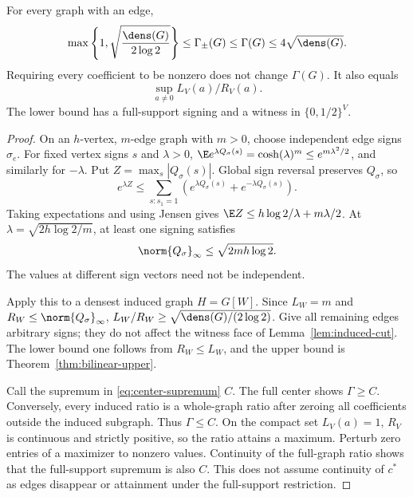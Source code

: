 \begin{theorem}\label{thm:graph-density}
For every graph with an edge,
\begin{equation}\label{eq:graph-density}
 \max\left\{1,\sqrt{\frac{\dens(G)}{2\log2}}\right\}
 \le\Gamma_\pm(G)\le\Gamma(G)\le4\sqrt{\dens(G)}.
\end{equation}
Requiring every coefficient to be nonzero does not change $\Gamma(G)$.
It also equals
\begin{equation}\label{eq:center-supremum}
 \sup_{a\ne0}L_V(a)/R_V(a).
\end{equation}
The lower bound has a full-support signing and a witness in $\{0,1/2\}^V$.
\end{theorem}
\begin{proof}
On an $h$-vertex, $m$-edge graph with $m>0$, choose independent edge signs
$\sigma_e$. For fixed vertex signs $s$ and $\lambda>0$,
$\E e^{\lambda Q_\sigma(s)}=\cosh(\lambda)^m\le e^{m\lambda^2/2}$,
and similarly for $-\lambda$. Put $Z=\max_s|Q_\sigma(s)|$. Global sign
reversal preserves $Q_\sigma$, so
\[
 e^{\lambda Z}\le\sum_{s:s_1=1}
       (e^{\lambda Q_\sigma(s)}+e^{-\lambda Q_\sigma(s)}).
\]
Taking expectations and using Jensen gives
$\E Z\le h\log2/\lambda+m\lambda/2$. At
$\lambda=\sqrt{2h\log2/m}$, at least one signing satisfies
\begin{equation}\label{eq:random-sign}
 \norm{Q_\sigma}_\infty\le\sqrt{2mh\log2}.
\end{equation}
The values at different sign vectors need not be independent.

Apply this to a densest induced graph $H=G[W]$. Since $L_W=m$ and
$R_W\le\norm{Q_\sigma}_\infty$,
$L_W/R_W\ge\sqrt{\dens(G)/(2\log2)}$. Give all remaining edges arbitrary
signs; they do not affect the witness face of Lemma~\ref{lem:induced-cut}.
The lower bound one follows from $R_W\le L_W$, and the upper bound is
Theorem~\ref{thm:bilinear-upper}.

Call the supremum in \eqref{eq:center-supremum} $C$. The full center shows
$\Gamma\ge C$. Conversely, every induced ratio is a whole-graph ratio
after zeroing all coefficients outside the induced subgraph. Thus
$\Gamma\le C$. On the compact set $L_V(a)=1$, $R_V$ is continuous and
strictly positive, so the ratio attains a maximum. Perturb zero entries
of a maximizer to nonzero values. Continuity of the full-graph ratio shows
that the full-support supremum is also $C$. This does not assume continuity
of $c^*$ as edges disappear or attainment under the full-support restriction.
\end{proof}

